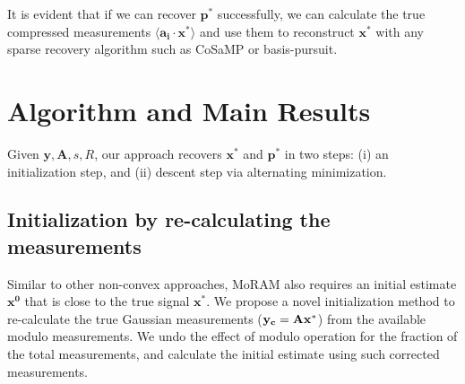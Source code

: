 It is evident that if we can recover $\mathbf{p^*}$ successfully, we can calculate the true compressed measurements $\langle \mathbf{a_i} \cdot \mathbf{x^*} \rangle$ and use them to reconstruct $\mathbf{x^*}$ with any sparse recovery algorithm such as CoSaMP or basis-pursuit.

\section{Algorithm and Main Results}
Given $\mathbf{y, A}, s, R$, our approach recovers $\mathbf{x^*}$ and $\mathbf{p^*}$ in two steps: (i) an initialization step, and (ii) descent step via alternating minimization.

\subsection{Initialization by re-calculating the measurements}
\label{sec:init}	
Similar to other non-convex approaches, MoRAM also requires an initial estimate $\mathbf{{x}^0}$ that is close to the true signal $\mathbf{{x}^*}$. We propose a novel initialization method to re-calculate the true Gaussian measurements ($\mathbf{y_c}= \mathbf{Ax^*}$) from the available modulo measurements. We undo the effect of modulo operation for the fraction of the total measurements, and calculate the initial estimate using such corrected measurements.
